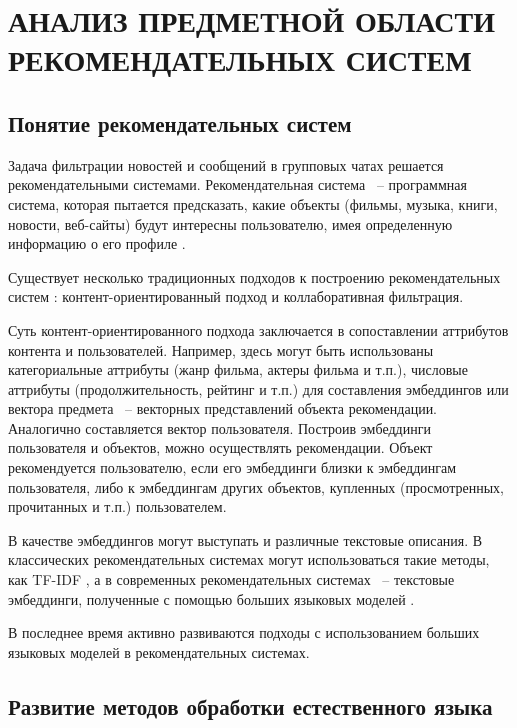 \chapter{АНАЛИЗ ПРЕДМЕТНОЙ ОБЛАСТИ РЕКОМЕНДАТЕЛЬНЫХ СИСТЕМ}
\label{chap:analysis}
\aftertitle

\section{Понятие рекомендательных систем}

Задача фильтрации новостей и сообщений в групповых чатах решается рекомендательными системами. Рекомендательная система ~--  программная система, которая пытается предсказать, какие объекты (фильмы, музыка, книги, новости, веб-сайты) будут интересны пользователю, имея определенную информацию о его профиле \cite{recommendation_system_wiki}.

Существует несколько традиционных подходов к построению рекомендательных систем \cite{recommendation_system_methods}: контент-ориентированный подход и коллаборативная фильтрация.

Суть контент-ориентированного подхода заключается в сопоставлении аттрибутов контента и пользователей. Например, здесь могут быть использованы категориальные аттрибуты (жанр фильма, актеры фильма и т.п.), числовые аттрибуты (продолжительность, рейтинг и т.п.) для составления эмбеддингов или вектора предмета ~-- векторных представлений объекта рекомендации. Аналогично составляется вектор пользователя. Построив эмбеддинги пользователя и объектов, можно осуществлять рекомендации. Объект рекомендуется пользователю, если его эмбеддинги близки к эмбеддингам пользователя, либо к эмбеддингам других объектов, купленных (просмотренных, прочитанных и т.п.) пользователем.

В качестве эмбеддингов могут выступать и различные текстовые описания. В классических рекомендательных системах могут использоваться такие методы, как TF-IDF \cite{no-patterns}, а в современных рекомендательных системах ~-- текстовые эмбеддинги, полученные с помощью больших языковых моделей \cite{tf_augumenting_recommendation}.

В последнее время активно развиваются подходы с использованием больших языковых моделей в рекомендательных системах.

\section{Развитие методов обработки естественного языка}

